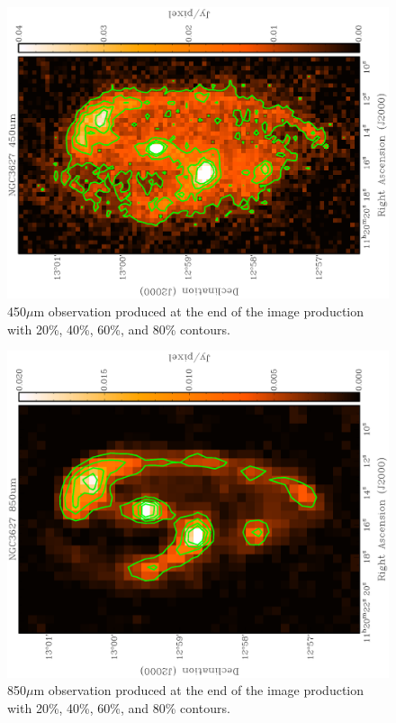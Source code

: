 \begin{figure}
  \centering
  \label{fig_450}
  \includegraphics[width=1.\textwidth,angle=270]{obs_imgs/450_um.eps}
  \caption[NGC3627 450$\mu$m Observations]{450$\mu$m observation produced at the end of the image production with 20\%, 40\%, 60\%, and 80\% contours.}
\end{figure}

\begin{figure}
  \centering
  \label{fig_850}
  \includegraphics[width=1.\textwidth,angle=270]{obs_imgs/850_um.eps}
  \caption[NGC3627 850$\mu$m Observations]{850$\mu$m observation produced at the end of the image production with 20\%, 40\%, 60\%, and 80\% contours.}
\end{figure}

